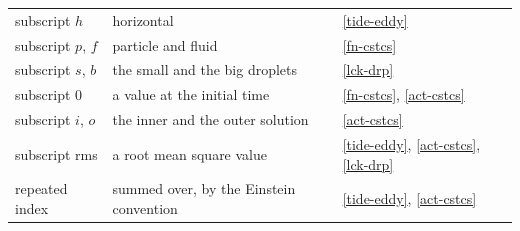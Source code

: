 \begin{longtable}{@{}p{}p{}p{}@{}}
subscript $h$ & horizontal & \ref{tide-eddy} \\
subscript $p$, $f$ & particle and fluid & \ref{fn-cstcs} \\
subscript $s$, $b$ & the small and the big droplets & \ref{lck-drp} \\
subscript $0$ & a value at the initial time & \ref{fn-cstcs}, \ref{act-cstcs} \\
subscript $i$, $o$ & the inner and the outer solution & \ref{act-cstcs} \\
subscript rms & a root mean square value & \ref{tide-eddy}, \ref{act-cstcs}, \ref{lck-drp} \\
repeated index & summed over, by the Einstein convention & \ref{tide-eddy}, \ref{act-cstcs} \\

\end{longtable}
\endgroup
